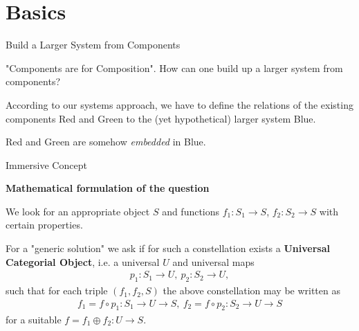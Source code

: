 \documentclass{beamer}
\title{Modelling Sustainable Systems\\ and Semantic Web\\[6pt]
  Immersive and Submersive System Theories
  \vskip1em}
\subtitle{Lecture in the Module 10-202-2312\\ for Master Computer Science}
\author{Prof. Dr. Hans-Gert Gräbe\\
\url{http://www.informatik.uni-leipzig.de/~graebe}}
\date{April 2022}
\newcommand{\ueberschrift}[1]{\begin{center}\bf #1\end{center}}
\begin{document}
{
\begin{frame}
  \titlepage
\end{frame}}

\section{Basics}
\begin{frame}{Build a Larger System from Components}

"Components are for Composition".  How can one build up a larger system from
  components?

According to our systems approach, we have to define the relations of the
existing components Red and Green to the (yet hypothetical) larger system
Blue. 
\begin{center}  
\end{center}
Red and Green are somehow \emph{embedded} in Blue.

\end{frame}
\begin{frame}{Immersive Concept}

\ueberschrift{Mathematical formulation of the question}
\small

We look for an appropriate object $S$ and functions $f_1: S_1 \rightarrow S$,
$f_2: S_2 \rightarrow S$ with certain properties.

For a "generic solution" we ask if for such a constellation exists a
\textbf{Universal Categorial Object}, i.e. a universal $U$ and universal maps
\begin{gather*}
  p_1: S_1 \rightarrow U,\ p_2: S_2 \rightarrow U,
\end{gather*}
such that for each triple $(f_1, f_2, S)$ the above constellation may be
written as
\begin{gather*}
  f_1 = f \circ p_1: S_1 \rightarrow U \rightarrow S,\ f_2 = f \circ p_2 : S_2
  \rightarrow U \rightarrow S
\end{gather*}
for a suitable $f = f_1 \oplus f_2: U \rightarrow S$.

\end{frame}
\end{document}
